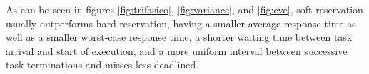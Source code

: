 \documentclass[times, 10pt,twocolumn]{article}
\begin{document}
\label{sec:conclusion}

As can be seen in figures \ref{fig:trifasico}, \ref{fig:variance}, and
\ref{fig:eve}, soft reservation usually outperforms hard reservation,
having a smaller average response time as well as a smaller worst-case
response time, a shorter waiting time between task arrival and start
of execution, and a more uniform interval between successive task
terminations and misses less deadlined.



\end{document}
